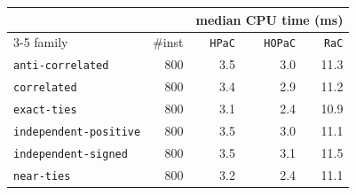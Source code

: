 \begin{tabular}{@{}lrrrr@{}}
\toprule
 &  & \multicolumn{3}{c}{median CPU time (ms)} \\
\cmidrule(l){3-5}
family & \#inst & \texttt{HPaC} & \texttt{HOPaC} & \texttt{RaC} \\
\midrule
\texttt{anti-correlated} & 800 & 3.5 & 3.0 & 11.3 \\
\texttt{correlated} & 800 & 3.4 & 2.9 & 11.2 \\
\texttt{exact-ties} & 800 & 3.1 & 2.4 & 10.9 \\
\texttt{independent-positive} & 800 & 3.5 & 3.0 & 11.1 \\
\texttt{independent-signed} & 800 & 3.5 & 3.1 & 11.5 \\
\texttt{near-ties} & 800 & 3.2 & 2.4 & 11.1 \\
\bottomrule
\end{tabular}
